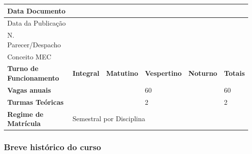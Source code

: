 \begin{table}[h]
\begin{tabular}{|l|l|l|l|l|l|}
Data Documento                  & \multicolumn{2}{l|}{}               & \multicolumn{3}{l|}{}                                                                          \\ \hline
Data da Publicação              & \multicolumn{2}{l|}{}               & \multicolumn{3}{l|}{}                                                                          \\ \hline
N. Parecer/Despacho             & \multicolumn{2}{l|}{}               & \multicolumn{3}{l|}{}                                                                          \\ \hline
Conceito MEC                    & \multicolumn{2}{l|}{}               & \multicolumn{3}{l|}{}                                                                          \\ \hline
\textbf{Turno de Funcionamento} & \textbf{Integral}                   & \textbf{Matutino}                   & \textbf{Vespertino} & \textbf{Noturno} & \textbf{Totais} \\ \hline
\textbf{Vagas anuais}           &                                     &                                     & 60                  &                  & 60              \\ \hline
\textbf{Turmas Teóricas}        &                                     &                                     & 2                   &                  & 2               \\ \hline
\textbf{Regime de Matrícula}    & \multicolumn{5}{l|}{Semestral por Disciplina}                                                                                        \\ \hline
\end{tabular}
\end{table}


\subsubsection{Breve histórico do curso}


